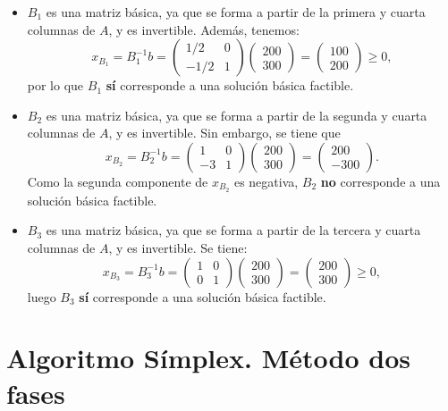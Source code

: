 \documentclass[11pt,a4paper]{article}
\begin{document}
\begin{itemize}
  \item $B_1$ es una matriz básica, ya que se forma a partir de la primera y cuarta columnas de $A$, y es invertible. Además, tenemos:
  \[
  x_{B_1}=B_1^{-1}b= \begin{pmatrix}
    1/2 & 0\\
    -1/2 & 1
  \end{pmatrix}\begin{pmatrix}
  200\\300
\end{pmatrix} = \begin{pmatrix}
100\\200
\end{pmatrix}\geq 0,
  \]
por lo que $B_1$ \textbf{sí} corresponde a una solución básica factible.
  \item $B_2$ es una matriz básica, ya que se forma a partir de la segunda y cuarta columnas de $A$, y es invertible. Sin embargo, se tiene que
  \[
  x_{B_2}=B_2^{-1}b= \begin{pmatrix}
    1 & 0\\
    -3 & 1
  \end{pmatrix}\begin{pmatrix}
  200\\300
\end{pmatrix} = \begin{pmatrix}
200\\-300
\end{pmatrix}.
  \]
Como la segunda componente de $x_{B_2}$ es negativa, $B_2$ \textbf{no} corresponde a una solución básica factible.
  \item $B_3$ es una matriz básica, ya que se forma a partir de la tercera y cuarta columnas de $A$, y es invertible. Se tiene:
  \[
  x_{B_3}=B_3^{-1}b= \begin{pmatrix}
    1 & 0\\
    0 & 1
  \end{pmatrix}\begin{pmatrix}
  200\\300
\end{pmatrix} = \begin{pmatrix}
200\\300
\end{pmatrix}\geq 0,
  \]
  luego $B_3$ \textbf{sí} corresponde a una solución básica factible.
\end{itemize}
\section{Algoritmo Símplex. Método dos fases}
\end{document}
